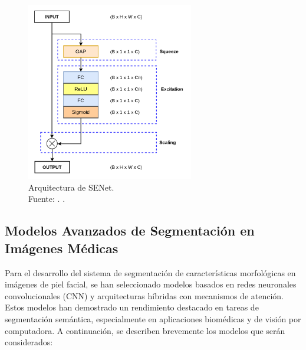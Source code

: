 \begin{itemize}
	\begin{figure}[H]
		\begin{center}
			\includegraphics[width=0.65\textwidth]{2/figures/senet.png}
			\caption[Arquitectura de SENet]{Arquitectura de SENet.\\
			Fuente: \cite{autor2022cnn}. .}
			\label{2:figarqsenet}
		\end{center}
	\end{figure}

\end{itemize}

\subsection{Modelos Avanzados de Segmentación en Imágenes Médicas} 

Para el desarrollo del sistema de segmentación de características morfológicas en imágenes de piel facial, se han seleccionado modelos basados en redes neuronales convolucionales (CNN) y arquitecturas híbridas con mecanismos de atención. Estos modelos han demostrado un rendimiento destacado en tareas de segmentación semántica, especialmente en aplicaciones biomédicas y de visión por computadora. A continuación, se describen brevemente los modelos que serán considerados:

